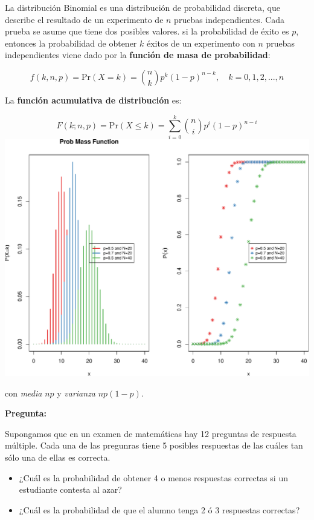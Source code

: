 \documentclass[]{article}
\def\tightlist{}
\numberwithin{equation}{section}
\begin{document}
La distribución Binomial es una distribución de probabilidad discreta,
que describe el resultado de un experimento de \(n\) pruebas
independientes. Cada prueba se asume que tiene dos posibles valores. si
la probabilidad de éxito es \(p\), entonces la probabilidad de obtener
\(k\) éxitos de un experimento con \(n\) pruebas independientes viene
dado por la \textbf{función de masa de probabilidad}:

\[
f(k,n,p) = \mbox{Pr}(X=k)=\binom{n}{k} p^k (1-p)^{n-k}, \quad k=0,1,2,...,n
\]

La \textbf{función acumulativa de distribución} es:

\[
F(k;n,p) = \mbox{Pr}(X\leq k) = \sum_{i=0}^{k}\binom{n}{i} p^i (1-p)^{n-i}
\] \includegraphics{tema4_files/figure-latex/unnamed-chunk-1-1.pdf}

con \emph{media} \(np\) y \emph{varianza} \(np(1-p)\).

\textbf{Pregunta:}

Supongamos que en un examen de matemáticas hay 12 preguntas de respuesta
múltiple. Cada una de las pregunras tiene 5 posibles respuestas de las
cuáles tan sólo una de ellas es correcta.

\begin{itemize}
\tightlist
\item
  ¿Cuál es la probabilidad de obtener 4 o menos respuestas correctas si
  un estudiante contesta al azar?
\end{itemize}

\begin{itemize}
\tightlist
\item
  ¿Cuál es la probabilidad de que el alumno tenga 2 ó 3 respuestas
  correctas?
\end{itemize}
\end{document}
